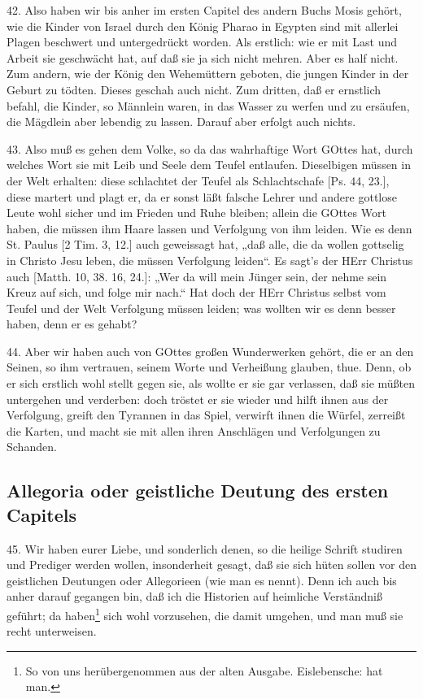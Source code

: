 42. Also haben wir bis anher im ersten Capitel des andern Buchs Mosis gehört, wie die Kinder von Israel durch den König Pharao in Egypten sind mit allerlei Plagen beschwert und untergedrückt worden. Als erstlich: wie er mit Last und Arbeit sie geschwächt hat, auf daß sie ja sich nicht mehren. Aber es half nicht. Zum andern, wie der König den Wehemüttern geboten, die jungen Kinder in der Geburt zu tödten. Dieses geschah auch nicht. Zum dritten, daß er ernstlich befahl, die Kinder, so Männlein waren, in das Wasser zu werfen und zu ersäufen, die Mägdlein aber lebendig zu lassen. Darauf aber erfolgt auch nichts.

43. Also muß es gehen dem Volke, so da das wahrhaftige Wort GOttes hat, durch welches Wort sie mit Leib und Seele dem Teufel entlaufen. Dieselbigen müssen in der Welt erhalten: diese schlachtet der Teufel als Schlachtschafe [Ps. 44, 23.], diese martert und plagt er, da er sonst läßt falsche Lehrer und andere gottlose Leute wohl sicher und im Frieden und Ruhe bleiben; allein die GOttes Wort haben, die müssen ihm Haare lassen und Verfolgung von ihm leiden. Wie es denn St. Paulus [2 Tim. 3, 12.] auch geweissagt hat, „daß alle, die da wollen gottselig in Christo Jesu leben, die müssen Verfolgung leiden“. Es sagt’s der HErr Christus auch [Matth. 10, 38. 16, 24.]: „Wer da will mein Jünger sein, der nehme sein Kreuz auf sich, und folge mir nach.“ Hat doch der HErr Christus selbst vom Teufel und der Welt Verfolgung müssen leiden; was wollten wir es denn besser haben, denn er es gehabt?

44. Aber wir haben auch von GOttes großen Wunderwerken gehört, die er an den Seinen, so ihm vertrauen, seinem Worte und Verheißung glauben, thue. Denn, ob er sich erstlich wohl stellt gegen sie, als wollte er sie gar verlassen, daß sie müßten untergehen und verderben: doch tröstet er sie wieder und hilft ihnen aus der Verfolgung, greift den Tyrannen in das Spiel, verwirft ihnen die Würfel, zerreißt die Karten, und macht sie mit allen ihren Anschlägen und Verfolgungen zu Schanden.

\subsection{Allegoria oder geistliche Deutung des ersten Capitels}

45. Wir haben eurer Liebe, und sonderlich denen, so die heilige Schrift studiren und Prediger werden wollen, insonderheit gesagt, daß sie sich hüten sollen vor den geistlichen Deutungen oder Allegorieen (wie man es nennt). Denn ich auch bis anher darauf gegangen bin, daß ich die Historien auf heimliche Verständniß geführt; da haben\footnote{So von uns herübergenommen aus der alten Ausgabe. Eislebensche: hat man.} sich wohl vorzusehen, die damit
umgehen, und man muß sie recht unterweisen.

